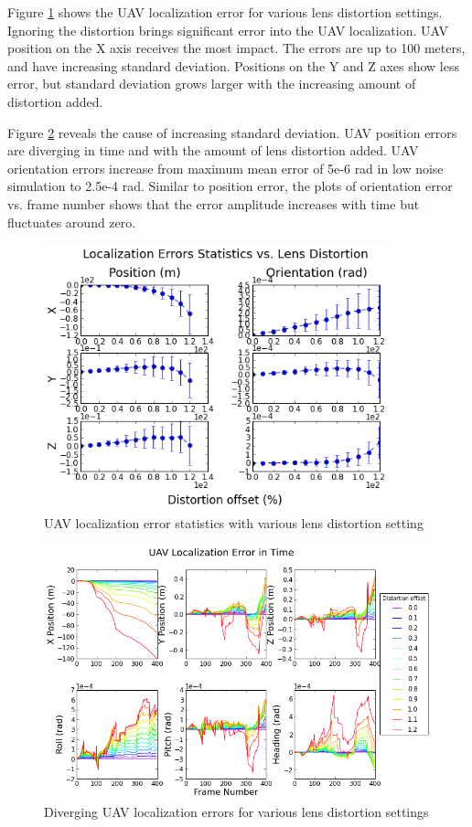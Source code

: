 Figure \ref{fig:simfig47} shows the UAV localization error for
various lens distortion settings. Ignoring the distortion brings
significant error into the UAV localization. UAV position on the X axis
receives the most impact. The errors are up to 100 meters, and have
increasing standard deviation. Positions on the Y and Z axes show less
error, but standard deviation grows larger with the increasing amount of
distortion added. 

Figure \ref{fig:simfig48} reveals the cause of increasing standard
deviation. UAV position errors are diverging in time and with the amount
of lens distortion added. UAV orientation errors increase from
maximum mean error of 5e-6 rad in low noise simulation to 2.5e-4
rad. Similar to position error, the plots of orientation error vs.
frame number shows that the error amplitude increases with time
but fluctuates around zero.

\begin{figure}[h]
  \centering
  \includegraphics[width=10cm,keepaspectratio=true]{./Figures/SimulationFigures/Figure47.png}
  \caption{UAV localization error statistics with various lens
    distortion setting}
  \label{fig:simfig47}
\end{figure}

\begin{figure}[h]
  \centering
  \includegraphics[width=14cm,keepaspectratio=true]{./Figures/SimulationFigures/Figure48.png}
  \caption{Diverging UAV localization errors for various lens
    distortion settings}
  \label{fig:simfig48}
\end{figure}


